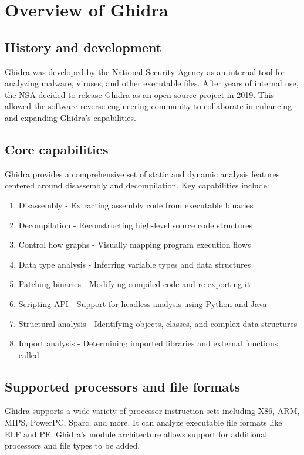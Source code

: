 \section{Overview of Ghidra}

\subsection{History and development}
Ghidra was developed by the National Security Agency as an internal tool for analyzing malware, viruses, and other executable files. After years of internal use, the NSA decided to release Ghidra as an open-source project in 2019. This allowed the software reverse engineering community to collaborate in enhancing and expanding Ghidra's capabilities.

\subsection{Core capabilities}
Ghidra provides a comprehensive set of static and dynamic analysis features centered around disassembly and decompilation. Key capabilities include:

\begin{enumerate}
    \item Disassembly - Extracting assembly code from executable binaries
    \item Decompilation - Reconstructing high-level source code structures
    \item Control flow graphs - Visually mapping program execution flows
    \item Data type analysis - Inferring variable types and data structures
    \item Patching binaries - Modifying compiled code and re-exporting it
    \item Scripting API - Support for headless analysis using Python and Java
    \item Structural analysis - Identifying objects, classes, and complex data structures
    \item Import analysis - Determining imported libraries and external functions called
\end{enumerate}


\subsection{Supported processors and file formats}
Ghidra supports a wide variety of processor instruction sets including X86, ARM, MIPS, PowerPC, Sparc, and more. It can analyze executable file formats like ELF and PE. Ghidra's module architecture allows support for additional processors and file types to be added.

